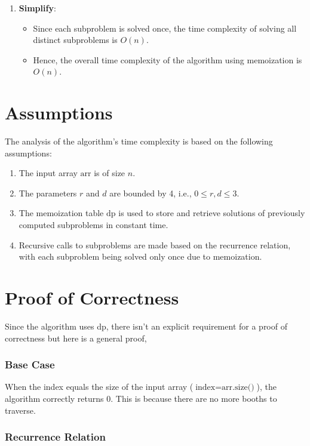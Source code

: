 \documentclass[8pt]{article}
\begin{document}
\begin{enumerate}
    \item \textbf{Simplify}:
    \begin{itemize}
        \item Since each subproblem is solved once, the time complexity of solving all distinct subproblems is \textbf{\( O(n) \)}.
        \item Hence, the overall time complexity of the algorithm using memoization is \textbf{\( O(n) \)}.
    \end{itemize}
\end{enumerate}


\section{Assumptions} 


The analysis of the algorithm's time complexity is based on the following assumptions:

\begin{enumerate}
    \item The input array \( \text{arr} \) is of size \( n \).
    \item The parameters \( r \) and \( d \) are bounded by 4, i.e., \( 0 \leq r, d \leq 3 \).
    \item The memoization table \( \text{dp} \) is used to store and retrieve solutions of previously computed subproblems in constant time.
    \item Recursive calls to subproblems are made based on the recurrence relation, with each subproblem being solved only once due to memoization.
\end{enumerate}

\section{Proof of Correctness}

Since the algorithm uses dp, there isn't an explicit requirement for a proof of correctness but here is a general proof,


\subsubsection{Base Case}

When the index equals the size of the input array (\( \text{index} = \text{arr.size()} \)), the algorithm correctly returns 0. This is because there are no more booths to traverse.

\subsubsection{Recurrence Relation}
\end{document}
